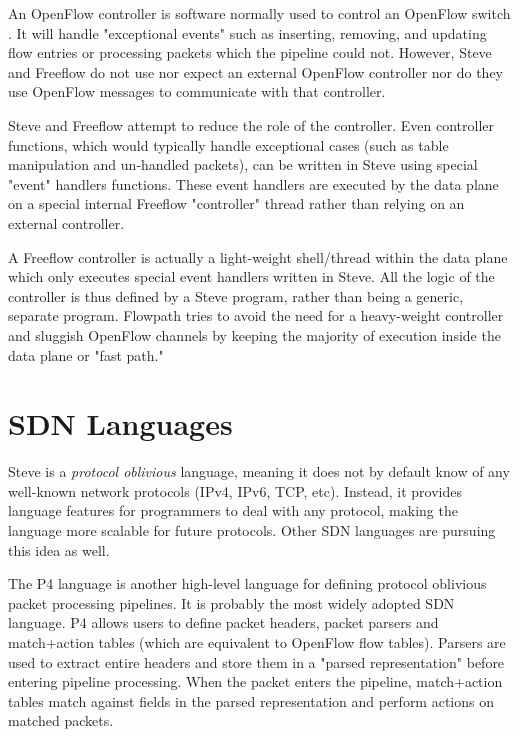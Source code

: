 An OpenFlow controller is software normally used to control an OpenFlow switch
\cite{openflow_spec}. It will handle "exceptional events" such as inserting,
removing, and updating flow entries or processing packets which the pipeline
could not. However, Steve and Freeflow do not use nor expect an external
OpenFlow controller nor do they use OpenFlow messages to communicate with that
controller. 

Steve and Freeflow attempt to reduce the role of the controller. Even controller
functions, which would typically handle exceptional cases (such as table
manipulation and un-handled packets), can be written in Steve using special
"event" handlers functions. These event handlers are executed by the data plane
on a special internal Freeflow "controller" thread rather than relying on an
external
controller. 

A Freeflow controller is actually a light-weight shell/thread within the data
plane which only executes special event handlers written in Steve. All the logic
of the controller is thus defined by a Steve program, rather than being a
generic, separate program. Flowpath tries to avoid the need for a heavy-weight
controller and sluggish OpenFlow channels by keeping the majority of execution
inside the data plane or "fast path."

\section{SDN Languages} \label{rel:p4}

Steve is a \textit{protocol oblivious} language, meaning it does not by default
know of any well-known network protocols (IPv4, IPv6, TCP, etc). Instead, it
provides language features for programmers to deal with any protocol, making the
language more scalable for future protocols. Other SDN languages are pursuing
this idea as well.

The P4 language \cite{p4_spec, p4_spec2} is another high-level language for
defining protocol oblivious packet processing pipelines. It is probably the
most widely adopted SDN language. P4 allows users to define packet headers,
packet parsers and
match+action tables (which are equivalent to OpenFlow flow tables). Parsers are
used to extract entire headers and store them in a "parsed representation"
before entering pipeline processing. When the packet enters the pipeline,
match+action tables match against fields in the parsed representation and
perform actions on matched packets. 

